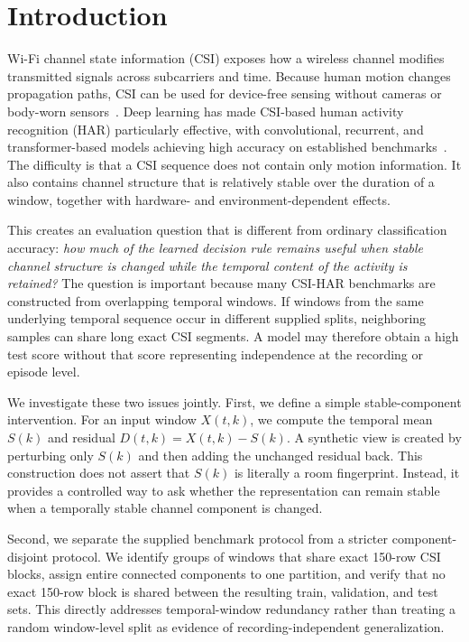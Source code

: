 \documentclass[runningheads]{llncs}
\begin{document}
\section{Introduction}

Wi-Fi channel state information (CSI) exposes how a wireless channel modifies transmitted signals across subcarriers and time. Because human motion changes propagation paths, CSI can be used for device-free sensing without cameras or body-worn sensors~\cite{halperin2011tool,ma2019wifi,yousefi2017survey}. Deep learning has made CSI-based human activity recognition (HAR) particularly effective, with convolutional, recurrent, and transformer-based models achieving high accuracy on established benchmarks~\cite{shi2022sensefi}. The difficulty is that a CSI sequence does not contain only motion information. It also contains channel structure that is relatively stable over the duration of a window, together with hardware- and environment-dependent effects.

This creates an evaluation question that is different from ordinary classification accuracy: \emph{how much of the learned decision rule remains useful when stable channel structure is changed while the temporal content of the activity is retained?} The question is important because many CSI-HAR benchmarks are constructed from overlapping temporal windows. If windows from the same underlying temporal sequence occur in different supplied splits, neighboring samples can share long exact CSI segments. A model may therefore obtain a high test score without that score representing independence at the recording or episode level.

We investigate these two issues jointly. First, we define a simple stable-component intervention. For an input window $X(t,k)$, we compute the temporal mean $S(k)$ and residual $D(t,k)=X(t,k)-S(k)$. A synthetic view is created by perturbing only $S(k)$ and then adding the unchanged residual back. This construction does not assert that $S(k)$ is literally a room fingerprint. Instead, it provides a controlled way to ask whether the representation can remain stable when a temporally stable channel component is changed.

Second, we separate the supplied benchmark protocol from a stricter component-disjoint protocol. We identify groups of windows that share exact 150-row CSI blocks, assign entire connected components to one partition, and verify that no exact 150-row block is shared between the resulting train, validation, and test sets. This directly addresses temporal-window redundancy rather than treating a random window-level split as evidence of recording-independent generalization.
\end{document}

